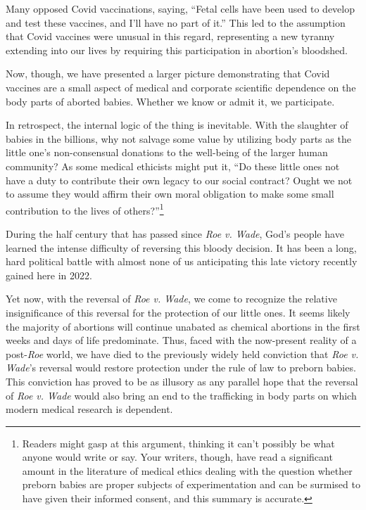 \documentclass[
]{book}
\begin{document}
Many opposed Covid vaccinations, saying, ``Fetal cells have been used to develop and test these vaccines, and I'll have no part of it.'' This led to the assumption that Covid vaccines were unusual in this regard, representing a new tyranny extending into our lives by requiring this participation in abortion's bloodshed.

Now, though, we have presented a larger picture demonstrating that Covid vaccines are a small aspect of medical and corporate scientific dependence on the body parts of aborted babies. Whether we know or admit it, we participate.

In retrospect, the internal logic of the thing is inevitable. With the slaughter of babies in the billions, why not salvage some value by utilizing body parts as the little one's non-consensual donations to the well-being of the larger human community? As some medical ethicists might put it, ``Do these little ones not have a duty to contribute their own legacy to our social contract? Ought we not to assume they would affirm their own moral obligation to make some small contribution to the lives of others?''\footnote{Readers might gasp at this argument, thinking it can't possibly be what anyone would write or say. Your writers, though, have read a significant amount in the literature of medical ethics dealing with the question whether preborn babies are proper subjects of experimentation and can be surmised to have given their informed consent, and this summary is accurate.}

During the half century that has passed since \emph{Roe v. Wade}, God's people have learned the intense difficulty of reversing this bloody decision. It has been a long, hard political battle with almost none of us anticipating this late victory recently gained here in 2022.

Yet now, with the reversal of \emph{Roe v. Wade}, we come to recognize the relative insignificance of this reversal for the protection of our little ones. It seems likely the majority of abortions will continue unabated as chemical abortions in the first weeks and days of life predominate. Thus, faced with the now-present reality of a post-\emph{Roe} world, we have died to the previously widely held conviction that \emph{Roe v. Wade}'s reversal would restore protection under the rule of law to preborn babies. This conviction has proved to be as illusory as any parallel hope that the reversal of \emph{Roe v. Wade} would also bring an end to the trafficking in body parts on which modern medical research is dependent.
\end{document}
